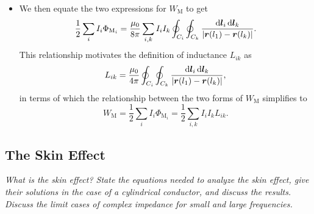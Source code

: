 \documentclass[11pt, a4paper]{article}
\newcommand{\diff}{\mathop{}\!\mathrm{d}} %
\renewcommand{\vec}[1]{\bm{#1}} %
\renewcommand{\r}{\vec{r}}
\newcommand{\mm}{\mu_{0}}  %
\begin{document}
\begin{itemize}
	\item We then equate the two expressions for $ W_{\text{M}} $ to get
	\begin{equation*}
		\frac{1}{2}\sum_{i}I_{i}\Phi_{\text{M}_{i}} = \frac{\mm}{8\pi}\sum_{i, k}I_{i}I_{k}\oint_{C_{i}}\oint_{C_{k}}\frac{\diff \vec{l}_{i}\diff \vec{l}_{k}}{\abs{\r(l_{1}) - \r(l_{k})}}.
	\end{equation*}
    This relationship motivates the definition of inductance $ L_{ik} $ as
	\begin{equation*}
		L_{ik} = \frac{\mm}{4\pi}\oint_{C_{i}}\oint_{C_{k}}\frac{\diff \vec{l}_{i}\diff \vec{l}_{k}}{\abs{\r(l_{1}) - \r(l_{k})}},
	\end{equation*}
    in terms of which the relationship between the two forms of $ W_{\text{M}} $ simplifies to
	\begin{equation*}
        W_{\text{M}} = \frac{1}{2}\sum_{i}I_{i}\Phi_{\text{M}_{i}} = \frac{1}{2} \sum_{i, k}I_{i}I_{k} L_{ik}.
	\end{equation*}

\end{itemize}

    
\subsection{The Skin Effect}
\textit{What is the skin effect? State the equations needed to analyze the skin effect, give their solutions in the case of a cylindrical conductor, and discuss the results. Discuss the limit cases of complex impedance for small and large frequencies.}
\end{document}
